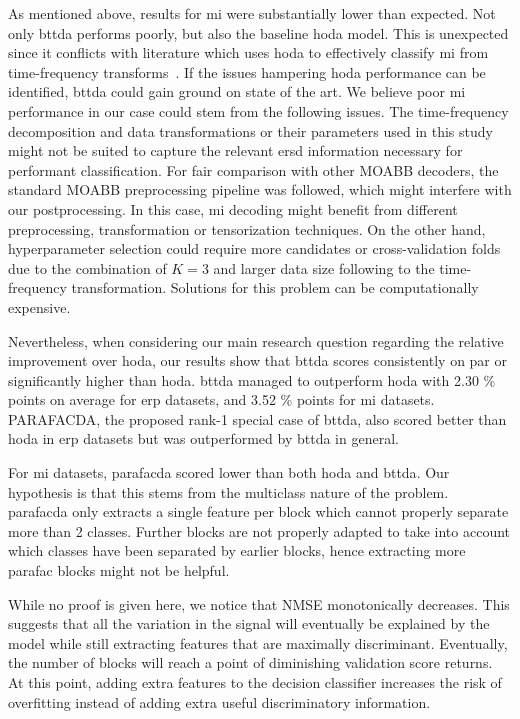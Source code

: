 \documentclass[twocolumn]{article}
\begin{document}
As mentioned above, results for \ac{mi} were substantially lower than expected.
Not only \ac{bttda} performs poorly, but also the baseline \ac{hoda} model.
This is unexpected since it conflicts with literature which uses \ac{hoda} to
effectively classify \ac{mi} from time-frequency transforms~\cite{Phan2010,Lotte2018,Liu2015,Cai2021}.
If the issues hampering \ac{hoda} performance can be identified, \ac{bttda}
could gain ground on state of the art.
We believe poor \ac{mi} performance in our case could stem from the following issues.
The time-frequency decomposition and data transformations or their parameters
used in this study might not be suited to capture the relevant \ac{ersd}
information necessary for performant classification.
For fair comparison with other MOABB decoders, the standard MOABB preprocessing
pipeline was followed, which might interfere with our postprocessing.
In this case, \ac{mi} decoding might benefit from different preprocessing,
transformation or	tensorization techniques.
On the other hand, hyperparameter selection could require more candidates or
cross-validation folds due to the combination of $K=3$ and larger data size following to the
time-frequency transformation.
Solutions for this problem can be computationally expensive.

Nevertheless, when considering our main research question regarding the
relative improvement over \ac{hoda}, our results show that
\ac{bttda} scores consistently on par or significantly higher than \ac{hoda}.
\Ac{bttda} managed to outperform \ac{hoda} with 2.30 \% points on average for
\ac{erp} datasets, and 3.52 \% points for \ac{mi} datasets.
PARAFACDA, the proposed rank-1  special case of \ac{bttda},
also scored better than  \ac{hoda} in \ac{erp} datasets but was
outperformed by \ac{bttda} in general.

For \ac{mi} datasets, \ac{parafacda} scored lower than both \ac{hoda} and \ac{bttda}.
Our hypothesis is that this stems from the multiclass nature of the problem.
\Ac{parafacda} only extracts a single feature per block which cannot properly
separate more than 2 classes.
Further blocks are not properly adapted to take into account which classes
have been separated by earlier blocks, hence extracting more \ac{parafac}
blocks might not be helpful.

While no proof is given here, we notice that NMSE monotonically decreases.
This suggests that all the variation in the signal will eventually be explained
by the model while still extracting features that are maximally discriminant.
Eventually, the number of blocks will reach a point of diminishing validation
score returns.
At this point, adding extra features to the decision classifier increases
the risk of overfitting instead of adding extra useful discriminatory
information.
\end{document}
